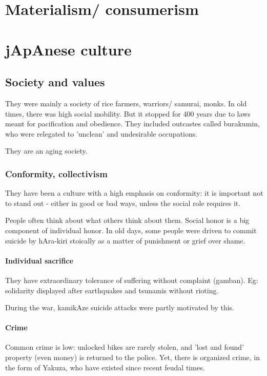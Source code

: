 \documentclass[oneside, article]{memoir}
\begin{document}
\chapter{Materialism/ consumerism}
\tbc

\chapter{jApAnese culture}
\section{Society and values}
They were mainly a society of rice farmers, warriors/ samurai, monks. In old times, there was high social mobility. But it stopped for 400 years due to laws meant for pacification and obedience. They included outcastes called burakumin, who were relegated to 'unclean' and undesirable occupations.

They are an aging society.

\subsection{Conformity, collectivism}
They have been a culture with a high emphasis on conformity: it is important not to stand out - either in good or bad ways, unless the social role requires it.

People often think about what others think about them. Social honor is a big component of individual honor. In old days, some people were driven to commit suicide by hAra-kiri stoically as a matter of punishment or grief over shame.

\subsubsection{Individual sacrifice}
They have extraordinary tolerance of suffering without complaint (gamban). Eg: solidarity displayed after earthquakes and tsunamis without rioting.

During the war, kamikAze suicide attacks were partly motivated by this.

\subsubsection{Crime}
Common crime is low: unlocked bikes are rarely stolen, and 'lost and found' property (even money) is returned to the police. Yet, there is organized crime, in the form of Yakuza, who have existed since recent feudal times.
\end{document}
